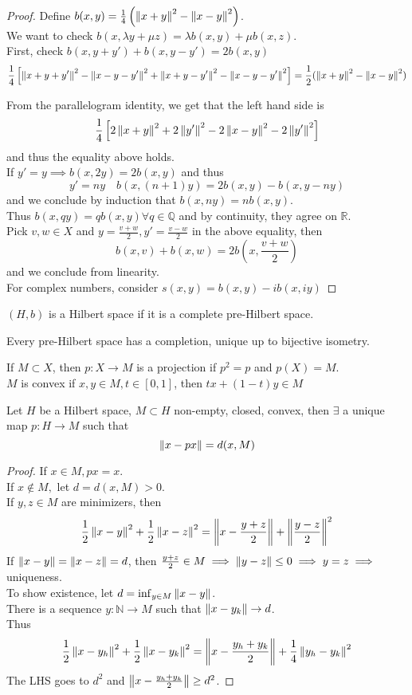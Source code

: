 \documentclass[../main.tex]{subfiles}
\begin{document}
\begin{proof}
	Define $b( x,y) = \frac{1}{4}\left( \left\lVert x+y\right\rVert^{2}-\left\lVert x-y\right\rVert^{2}\right) $.\\
	We want to check $b( x,\lambda y + \mu z ) = \lambda b( x,y) + \mu b( x,z) $.\\
	First, check $b( x,y+y') + b( x,y-y') = 2b( x,y) $ 
	\[ 
		\frac{1}{4}\left[ \left\lVert x+y+y'\right\rVert ^{2} - \left\lVert x-y-y'\right\rVert^{2} + \left\lVert x+y-y'\right\rVert^{2} - \left\lVert x-y-y'\right\rVert^{2}\right] = \frac{1}{2} ( \left\lVert x+y\right\rVert^{2} - \left\lVert x-y\right\rVert^{2}) 
	\]
	
	From the parallelogram identity, we get that the left hand side is
	\[ 
		\frac{1}{4} \left[ 2 \left\lVert x+y\right\rVert^{2} + 2\left\lVert y'\right\rVert^{2} - 2 \left\lVert x-y\right\rVert^{2} - 2 \left\lVert y'\right\rVert^{2}\right] 
	\]
	and thus the equality above holds.\\
	If $y'=y \implies b( x,2y ) = 2 b( x,y) $ and thus 
	\[ 
	y' = ny \quad b( x, ( n+1) y) = 2 b( x,y) - b( x,y-ny) 
	\]
	and we conclude by induction that $b( x,ny) = n b( x,y) $.\\
	Thus $b( x,qy) = q b( x,y) \forall q \in \mathbb{Q}$ and by continuity, they agree on $ \mathbb{R}$.\\
	Pick $v,w \in X$ and $y = \frac{v+w}{2}, y' = \frac{v-w}{2}$ in the above equality, then
	\[ 
	b( x,v) + b( x,w) = 2 b( x, \frac{v+w}{2}) 
	\]
	and we conclude from linearity.\\
	For complex numbers, consider $s( x,y) = b( x,y)  - i b( x,iy) $ 
	
\end{proof}
\begin{defn}
$( H,b) $ is a Hilbert space if it is a complete pre-Hilbert space.
\end{defn}
\begin{lemma}
Every pre-Hilbert space has a completion, unique up to bijective isometry.
\end{lemma}
If $M \subset X$, then $p:X\to M$ is a projection if $p^{2}=p$ and $p( X) = M$.\\
$M$ is convex if $x,y \in M, t \in [ 0,1] $, then $tx + ( 1-t) y \in M$ 
\begin{thm}
	Let $H$ be a Hilbert space, $M \subset H$ non-empty, closed, convex, then $\exists $ a unique map $p:H \to M$ such that
	\[ 
		\left\lVert x- px\right\rVert = d( x,M) 
	\]
	
\end{thm}
\begin{proof}
If $x\in M, px=x$.\\
If $x\notin M, $ let $d= d( x,M) >0$.\\
If $y,z\in M$ are minimizers, then
\[ 
	\frac{1}{2}\left\lVert x-y\right\rVert^{2} + \frac{1}{2}\left\lVert x-z\right\rVert^{2} = \left\lVert x- \frac{y+z}{2}\right\rVert + \left\lVert \frac{y-z}{2}\right\rVert^{2}
\]
If $\left\lVert x-y\right\rVert = \left\lVert x-z\right\rVert =d$, then $\frac{y+z}{2}\in M \implies \left\lVert y-z\right\rVert \leq 0 \implies y=z\implies $ uniqueness.\\
To show existence, let $d= \inf_{y \in M} \left\lVert x-y\right\rVert$.\\
There is a sequence $y: \mathbb{N}\to M$ such that $\left\lVert x-y_k\right\rVert \to d$.\\
Thus
\[ 
	\frac{1}{2} \left\lVert x-y_h\right\rVert^{2} + \frac{1}{2}\left\lVert x-y_k\right\rVert^{2} = \left\lVert x - \frac{y_h+ y_k}{2}\right\rVert + \frac{1}{4}\left\lVert y_h -y_k\right\rVert^{2}
\]
The LHS goes to $d^{2}$ and $\left\lVert  x-\frac{y_h + y_k}{2}\right\rVert \geq d^{2}$.
\end{proof}
\end{document}

